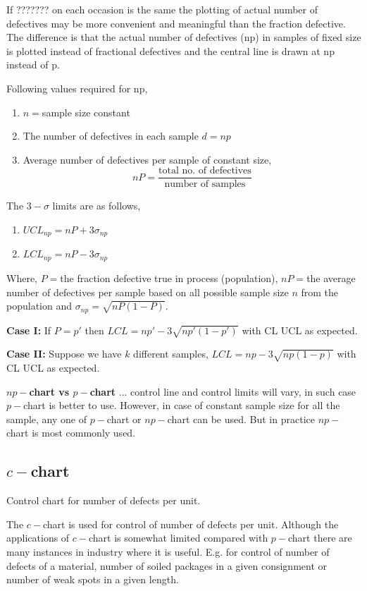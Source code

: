 \documentclass[oneside,11pt,pdftex]{book}%
\numberwithin{equation}{section}
\numberwithin{section}{chapter}
\numberwithin{equation}{chapter}
\begin{document}
If ??????? on each occasion is the same the plotting of actual number of defectives may be more convenient and meaningful than the fraction defective. The difference is that the actual number of defectives (np) in samples of fixed size is plotted instead of fractional defectives and the central line is drawn at np instead of p.

Following values required for np,
\begin{enumerate}
	\item $n=$sample size constant
	\item The number of defectives in each sample $d=np$
	\item Average number of defectives per sample of constant size, $$nP=\frac{\text{total no. of defectives}}{\text{number of samples}}$$ 
\end{enumerate}
The $ 3-\sigma  $ limits are as follows,
\begin{enumerate}
	\item $ UCL_{np} = nP+3\sigma_{np}$
	\item $ LCL_{np} =nP-3\sigma_{np}$
\end{enumerate}
Where, $ P= $the fraction defective true in process (population), $ nP= $the average number of defectives per sample based on all possible sample size $ n $ from the population and $ \sigma_{np}=\sqrt{nP(1-P)} $.

\textbf{Case I: }If $ P=p' $ then $ LCL=np'-3\sqrt{np'(1-p')} $ with CL UCL as expected.

\textbf{Case II: }Suppose we have $ k $ different samples, $ LCL=np-3\sqrt{np(1-p)} $ with CL UCL as expected.


\textbf{$ np -$chart vs $ p- $chart}
... control line and control limits will vary, in such case $ p- $chart is better to use. However, in case of constant sample size for all the sample, any one of $ p- $chart or $ np- $chart can be used. But in practice $ np- $chart is most commonly used.

\subsection{$ c- $chart}
Control chart for number of defects per unit.

The $ c-$chart is used for control of number of defects per unit. Although the applications of $ c- $chart is somewhat limited compared with $ p- $chart there are many instances in industry where it is useful. E.g. for control of number of defects of a material, number of soiled packages in a given consignment or number of weak spots in a given length.
\end{document}
